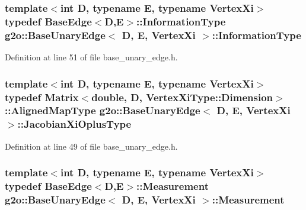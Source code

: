 \subsubsection[{\texorpdfstring{Information\+Type}{InformationType}}]{\setlength{\rightskip}{0pt plus 5cm}template$<$int D, typename E, typename Vertex\+Xi$>$ typedef {\bf Base\+Edge}$<$D,E$>$\+::{\bf Information\+Type} {\bf g2o\+::\+Base\+Unary\+Edge}$<$ D, E, Vertex\+Xi $>$\+::{\bf Information\+Type}}\hypertarget{classg2o_1_1BaseUnaryEdge_a6753caa95c30fa5bb3887e2a30892ff3}{}\label{classg2o_1_1BaseUnaryEdge_a6753caa95c30fa5bb3887e2a30892ff3}


Definition at line 51 of file base\+\_\+unary\+\_\+edge.\+h.

\subsubsection[{\texorpdfstring{Jacobian\+Xi\+Oplus\+Type}{JacobianXiOplusType}}]{\setlength{\rightskip}{0pt plus 5cm}template$<$int D, typename E, typename Vertex\+Xi$>$ typedef Matrix$<$double, D, Vertex\+Xi\+Type\+::\+Dimension$>$\+::Aligned\+Map\+Type {\bf g2o\+::\+Base\+Unary\+Edge}$<$ D, E, Vertex\+Xi $>$\+::{\bf Jacobian\+Xi\+Oplus\+Type}}\hypertarget{classg2o_1_1BaseUnaryEdge_a24bcabd661223e15b7337f2835310f5e}{}\label{classg2o_1_1BaseUnaryEdge_a24bcabd661223e15b7337f2835310f5e}


Definition at line 49 of file base\+\_\+unary\+\_\+edge.\+h.

\subsubsection[{\texorpdfstring{Measurement}{Measurement}}]{\setlength{\rightskip}{0pt plus 5cm}template$<$int D, typename E, typename Vertex\+Xi$>$ typedef {\bf Base\+Edge}$<$D,E$>$\+::{\bf Measurement} {\bf g2o\+::\+Base\+Unary\+Edge}$<$ D, E, Vertex\+Xi $>$\+::{\bf Measurement}}\hypertarget{classg2o_1_1BaseUnaryEdge_ab953b076b4c35fcf99de02bd0bfcc1ae}{}\label{classg2o_1_1BaseUnaryEdge_ab953b076b4c35fcf99de02bd0bfcc1ae}


